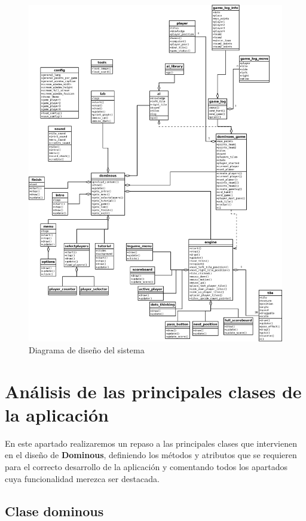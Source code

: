 \begin{figure}[h]
  \label{diagrama_clases_diseno}
  \begin{center}
    \includegraphics[scale=0.23]{diagrama_clases_diseno.png}
  \end{center}
  \caption{Diagrama de diseño del sistema}
\end{figure}


\section{Análisis de las principales clases de la aplicación}

En este apartado realizaremos un repaso a las principales clases que intervienen en el diseño de \textbf{Dominous},
definiendo los métodos y atributos que se requieren para el correcto desarrollo de la aplicación y comentando
todos los apartados cuya funcionalidad merezca ser destacada.

\subsection{Clase dominous}


